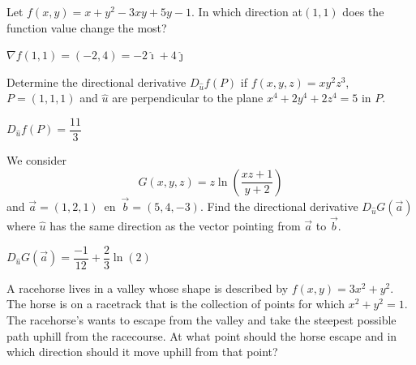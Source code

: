 \begin{Exercise}[difficulty = 2] Let $f(x,y) = x+y^2-3xy+5y-1$. In which direction at$(1,1)$ does the function value change the most?
\end{Exercise}

\begin{Answer}

    $\nabla f (1,1) = (-2,4) = -2 \hat{\imath} +4 \hat{\jmath} $
\end{Answer}

\begin{Exercise}[difficulty = 3] Determine the directional derivative $D_{\hat u} f(P)$ if $f(x,y,z)=xy^2z^3$, $P=(1,1,1)$ and $\hat u$ are perpendicular to the plane $x^4 + 2y^4 + 2z^4 = 5$ in $P$.
\end{Exercise}

\begin{Answer}

    $D_{\hat u} f(P) = \dfrac{11}{3}$
\end{Answer}

\ifanalysis
\begin{Exercise}[difficulty = 2] We consider 
$$G(x,y,z)= z \ln \left( \dfrac{xz+1}{y+2}\right)$$
and  $\vec a = (1,2,1) \,$ en $\,\vec b = (5,4,-3)$. 
Find the directional derivative $D_{\hat u}G(\vec a)$ where $\hat u$ has the same direction as the vector pointing from $\vec a $ to $\vec b$.
\end{Exercise}

\begin{Answer}

    $D_{\hat u}G(\vec a) = \dfrac{-1}{12} + \dfrac{2}{3} \ln (2)$
\end{Answer}
\fi



\ifanalysis
\begin{Exercise}[difficulty = 3] A racehorse lives in a valley whose shape is described by $f(x,y)= 3x^2 + y^2$. The horse is on a racetrack that is the collection of points for which  $x^2+y^2=1$. The racehorse's wants to escape from the valley and take the steepest possible path uphill from the racecourse. At what point should the horse escape and in which direction should it move uphill from that point?
\end{Exercise}

